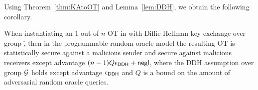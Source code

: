 Using Theorem~\ref{thm:KAtoOT} and Lemma~\ref{lem:DDH}, we obtain the following corollary.

\begin{corollary}
When instantiating an $1$ out of $n$ OT in  with Diffie-Hellman key exchange over group \G, then in the programmable random oracle model the resulting OT is statistically secure against a malicious sender and secure against malicious receivers except advantage $(n-1)Q\epsilon_{\mathsf{DDH}}+\mathsf{negl}$, where the DDH assumption over group $\mathcal{G}$ holds except advantage $\epsilon_{\mathsf{DDH}}$ and $Q$ is a bound on the amount of adversarial random oracle queries.
\end{corollary}
